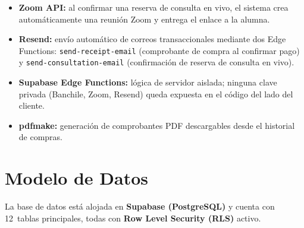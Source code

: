 \documentclass[a4paper,11pt]{article}
\begin{document}
\begin{itemize}[leftmargin=1.6em, itemsep=3pt]
  \item \textbf{Zoom API:}
        al confirmar una reserva de consulta en vivo, el sistema crea autom\'aticamente
        una reuni\'on Zoom y entrega el enlace a la alumna.
  \item \textbf{Resend:}
        env\'io autom\'atico de correos transaccionales mediante dos Edge Functions:
        \texttt{send-receipt-email} (comprobante de compra al confirmar pago)
        y \texttt{send-consultation-email} (confirmaci\'on de reserva de consulta en vivo).
  \item \textbf{Supabase Edge Functions:}
        l\'ogica de servidor aislada; ninguna clave privada (Banchile, Zoom, Resend)
        queda expuesta en el c\'odigo del lado del cliente.
  \item \textbf{pdfmake:}
        generaci\'on de comprobantes PDF descargables desde el historial de compras.
\end{itemize}


\section{Modelo de Datos}
\label{sec:datos}

La base de datos est\'a alojada en \textbf{Supabase (PostgreSQL)} y cuenta con 12~tablas
principales, todas con \textbf{Row Level Security (RLS)} activo.
\end{document}
